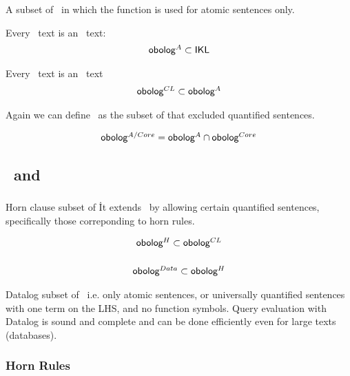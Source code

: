 A subset of \IKL\ in which the  function is used for atomic sentences only. 

Every \ObologA\ text is an \IKL\ text:
\begin{eqnarray*}
\mbox{\sf obolog$^{A}$} \subset \mbox{\sf IKL}
\end{eqnarray*}

Every \ObologCL\ text is an \ObologA\ text
\begin{eqnarray*}
\mbox{\sf obolog$^{CL}$} \subset \mbox{\sf obolog$^{A}$}
\end{eqnarray*}

Again we can define \ObologACore\ as the subset of \ObologA that
excluded quantified sentences.

\begin{eqnarray*}
\mbox{\sf obolog$^{A/Core}$} = \mbox{\sf obolog$^{A}$} \cap \mbox{\sf obolog$^{Core}$}
\end{eqnarray*}

\subsection{\ObologH\ and \ObologData}

\subsubsection{\ObologH}

Horn clause subset of \ObologCL\. It extends \ObologCore\ by allowing
certain quantified sentences, specifically those correponding to horn rules.

\begin{eqnarray*}
\mbox{\sf obolog$^{H}$} \subset \mbox{\sf obolog$^{CL}$}
\end{eqnarray*}



\subsubsection{\ObologData}

\begin{eqnarray*}
\mbox{\sf obolog$^{Data}$} \subset \mbox{\sf obolog$^{H}$}
\end{eqnarray*}

Datalog subset of \ObologCL\ i.e. only atomic sentences, or
universally quantified sentences with one term on the LHS, and no
function symbols.  Query evaluation with Datalog is sound and complete
and can be done efficiently even for large texts (databases).


\subsubsection{Horn Rules}











